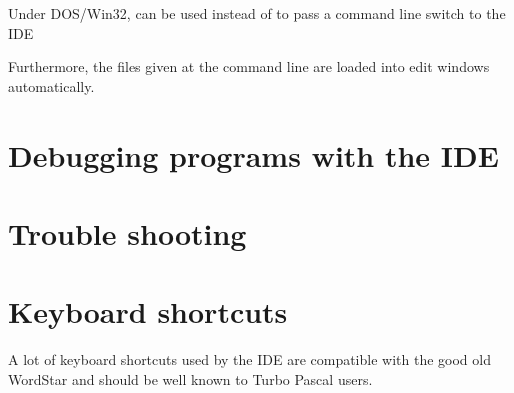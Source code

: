 Under DOS/Win32, \var{/} can be used instead of \var{\-} to pass a 
command line switch to the IDE

Furthermore, the files given at the command line are loaded into edit
windows automatically.

\section{Debugging programs with the IDE}

\section{Trouble shooting}

\section{Keyboard shortcuts}

A lot of keyboard shortcuts used by the IDE are compatible with the
good old WordStar and should be well known to Turbo Pascal users.


